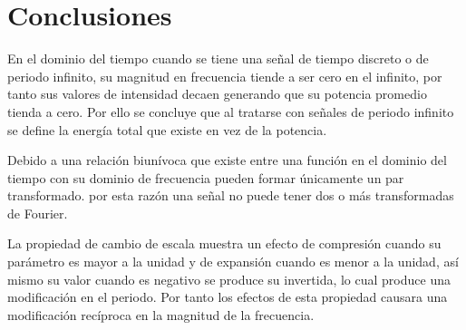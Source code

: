 \documentclass[11pt,letterpaper,twocolumn]{article}
\begin{document}
\section{Conclusiones}
    En el dominio del tiempo cuando se tiene una señal de tiempo discreto o de periodo infinito,
    su magnitud en frecuencia tiende a ser cero en el infinito, por tanto sus valores de 
    intensidad decaen generando que su potencia promedio tienda a cero. Por ello se concluye 
    que al tratarse con señales de periodo infinito se define la energía total que existe en vez 
    de la potencia.
    
    Debido a una relación biunívoca que existe entre una función en el dominio del tiempo con su 
    dominio de frecuencia pueden formar únicamente un par transformado. por esta razón una señal 
    no puede tener dos o más transformadas de Fourier.
    
    La propiedad de cambio de escala muestra un efecto de compresión cuando su parámetro es 
    mayor a la unidad y de expansión cuando es menor a la unidad, así mismo su valor cuando es 
    negativo se produce su invertida, lo cual produce una modificación en el periodo. Por tanto
    los efectos de esta propiedad causara una modificación recíproca en la magnitud de la 
    frecuencia.
    
    





    
\end{document}
